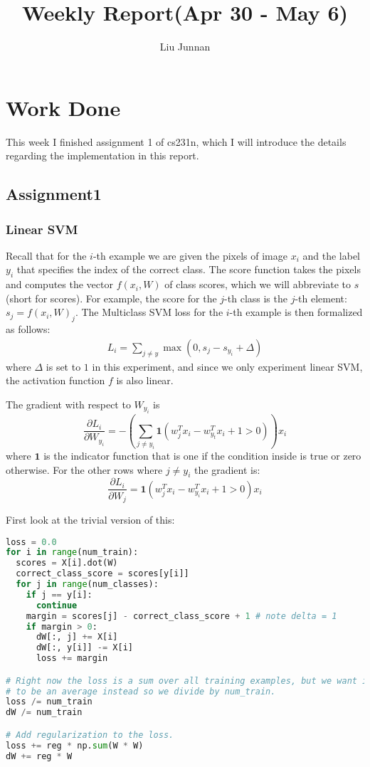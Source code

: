 \documentclass{article} %
\title{Weekly Report(Apr 30 - May 6)}
\author{
Liu Junnan
}
\begin{document}
\maketitle

\begin{abstract}

\end{abstract}

\section{Work Done}
This week I finished assignment 1 of cs231n, which I will introduce the details regarding the implementation in this report.

\subsection{Assignment1}
\subsubsection{Linear SVM}
Recall that for the $i$-th example we are given the pixels of image $x_i$ and the label $y_i$ that specifies the index of the correct class. The score function takes the pixels and computes the vector $f(x_i,W)$ of class scores, which we will abbreviate to $s$ (short for scores). For example, the score for the $j$-th class is the $j$-th element: $s_j=f(x_i,W)_j$. The Multiclass SVM loss for the $i$-th example is then formalized as follows:
\begin{eqnarray}
L_i=\sum_{j \ne y} \max(0,s_j - s_{y_i} + \Delta)
\label{eqn:svm-loss}
\end{eqnarray}
where $\Delta$ is set to $1$ in this experiment, and since we only experiment linear SVM, the activation function $f$ is also linear.

The gradient with respect to $W_{y_i}$ is
$$\frac{\partial L_i}{\partial W_{y_i}}= -(\sum_{j \ne y_i} \mathbf{1}(w_j^T x_i - w_{y_t}^T x_i + 1 > 0))x_i $$
where $\mathbf{1}$ is the indicator function that is one if the condition inside is true or zero otherwise. For the other rows where $j \ne y_i$ the gradient is:
$$\frac{\partial L_i}{\partial W_j} = \mathbf{1}(w_j^T x_i - w_{y_i}^T x_i + 1 > 0)x_i$$

First look at the trivial version of this:
\begin{lstlisting}[language=python]
loss = 0.0
for i in range(num_train):
  scores = X[i].dot(W)
  correct_class_score = scores[y[i]]
  for j in range(num_classes):
    if j == y[i]:
      continue
    margin = scores[j] - correct_class_score + 1 # note delta = 1
    if margin > 0:
      dW[:, j] += X[i]
      dW[:, y[i]] -= X[i]
      loss += margin

# Right now the loss is a sum over all training examples, but we want it
# to be an average instead so we divide by num_train.
loss /= num_train
dW /= num_train

# Add regularization to the loss.
loss += reg * np.sum(W * W)
dW += reg * W
\end{lstlisting}
\end{document}

